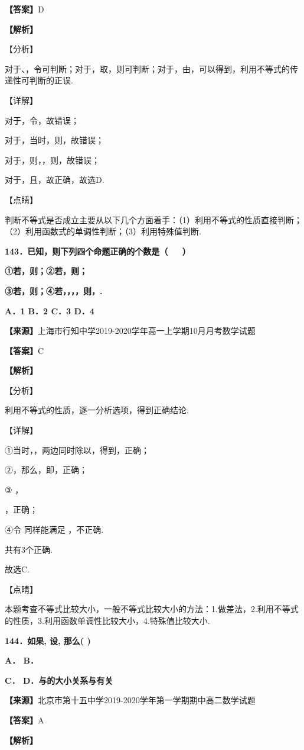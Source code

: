 \documentclass[
]{article}
\begin{document}
\textbf{【答案】}D

\textbf{【解析】}

【分析】

对于、，令可判断；对于，取，则可判断；对于，由，可以得到，利用不等式的传递性可判断的正误.

【详解】

对于，令，故错误；

对于，当时，则，故错误；

对于，则，，则，故错误；

对于，且，故正确，故选D.

【点睛】

判断不等式是否成立主要从以下几个方面着手：（1）利用不等式的性质直接判断；（2）利用函数式的单调性判断；（3）利用特殊值判断.

\textbf{143．已知，则下列四个命题正确的个数是（ 　 ）}

\textbf{①若，则；②若，则；}

\textbf{③若，则；④若，，，，则，.}

\textbf{A．1 B．2 C．3 D．4}

\textbf{【来源】}上海市行知中学2019-2020学年高一上学期10月月考数学试题

\textbf{【答案】}C

\textbf{【解析】}

【分析】

利用不等式的性质，逐一分析选项，得到正确结论.

【详解】

①当时，，两边同时除以，得到，正确；

②，那么，即，正确；

③ ，

，正确；

④令 同样能满足 ，不正确.

共有3个正确.

故选C.

【点睛】

本题考查不等式比较大小，一般不等式比较大小的方法：1.做差法，2.利用不等式的性质，3.利用函数单调性比较大小，4.特殊值比较大小.

\textbf{144．如果, 设, 那么( )}

\textbf{A． B．}

\textbf{C． D．与的大小关系与有关}

\textbf{【来源】}北京市第十五中学2019-2020学年第一学期期中高二数学试题

\textbf{【答案】}A

\textbf{【解析】}
\end{document}
